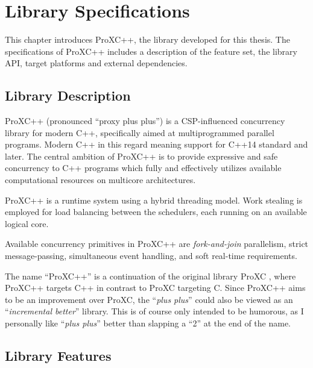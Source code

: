 
\chapter{Library Specifications}
\label{ch:library_specifications}


This chapter introduces ProXC++, the library developed for this thesis. The specifications of ProXC++ includes a description of the feature set, the library API, target platforms and external dependencies. 


\section{Library Description}
\label{sec:library_overview}


ProXC++ (pronounced ``proxy plus plus'') is a CSP\hyp{}influenced concurrency library for modern C++, specifically aimed at multiprogrammed parallel programs. Modern C++ in this regard meaning support for C++14 standard and later. The central ambition of ProXC++ is to provide expressive and safe concurrency to C++ programs which fully and effectively utilizes available computational resources on multicore architectures.

ProXC++ is a runtime system using a hybrid threading model. Work stealing is employed for load balancing between the schedulers, each running on an available logical core. 

Available concurrency primitives in ProXC++ are \textit{fork\hyp{}and\hyp{}join} parallelism, strict message\hyp{}passing, simultaneous event handling, and soft real\hyp{}time requirements.

The name ``ProXC++'' is a continuation of the original library ProXC \citep{pettersen2016proxc}, where ProXC++ targets C++ in contrast to ProXC targeting C. Since ProXC++ aims to be an improvement over ProXC, the ``\textit{plus plus}'' could also be viewed as an ``\textit{incremental better}'' library. This is of course only intended to be humorous, as I personally like ``\textit{plus plus}'' better than slapping a ``2'' at the end of the name.


\section{Library Features}
\label{sec:library_features}


